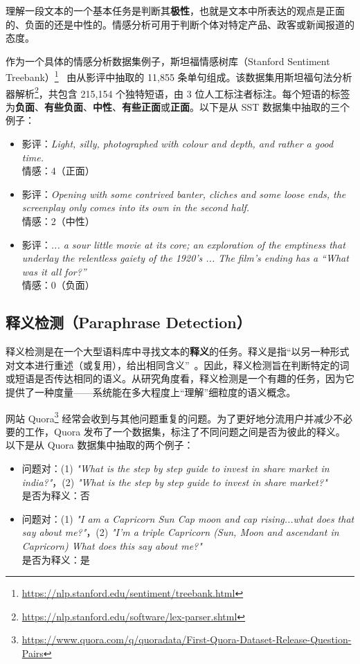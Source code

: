 \documentclass[11pt]{article}
\begin{document}
理解一段文本的一个基本任务是判断其\textbf{极性}，也就是文本中所表达的观点是正面的、负面的还是中性的。情感分析可用于判断个体对特定产品、政客或新闻报道的态度。

作为一个具体的情感分析数据集例子，斯坦福情感树库（Stanford Sentiment Treebank）\footnote{\url{https://nlp.stanford.edu/sentiment/treebank.html}}~\cite{socher2013recursive} 由从影评中抽取的 11{,}855 条单句组成。该数据集用斯坦福句法分析器解析\footnote{\url{https://nlp.stanford.edu/software/lex-parser.shtml}}，共包含 215{,}154 个独特短语，由 3 位人工标注者标注。每个短语的标签为\textbf{负面}、\textbf{有些负面}、\textbf{中性}、\textbf{有些正面}或\textbf{正面}。以下是从 SST 数据集中抽取的三个例子：

\begin{itemize}[leftmargin=2em]
  \item 影评：\textit{Light, silly, photographed with colour and depth, and rather a good time.}\\
        情感：4（正面）
  \item 影评：\textit{Opening with some contrived banter, cliches and some loose ends, the screenplay only comes into its own in the second half.}\\
        情感：2（中性）
  \item 影评：\textit{... a sour little movie at its core; an exploration of the emptiness that underlay the relentless gaiety of the 1920's ... The film's ending has a ``What was it all for?''}\\
        情感：0（负面）
\end{itemize}

\subsection{释义检测（Paraphrase Detection）}

释义检测是在一个大型语料库中寻找文本的\textbf{释义}的任务。释义是指``以另一种形式对文本进行重述（或复用），给出相同含义''~\cite{fernando2008semantic}。因此，释义检测旨在判断特定的词或短语是否传达相同的语义。从研究角度看，释义检测是一个有趣的任务，因为它提供了一种度量——系统能在多大程度上``理解''细粒度的语义概念。

网站 Quora\footnote{\url{https://www.quora.com/q/quoradata/First-Quora-Dataset-Release-Question-Pairs}} 经常会收到与其他问题重复的问题。为了更好地分流用户并减少不必要的工作，Quora 发布了一个数据集，标注了不同问题之间是否为彼此的释义。以下是从 Quora 数据集中抽取的两个例子：

\begin{itemize}[leftmargin=2em]
  \item 问题对：(1) \textit{"What is the step by step guide to invest in share market in india?"}，(2) \textit{"What is the step by step guide to invest in share market?"}\\
        是否为释义：否
  \item 问题对：(1) \textit{"I am a Capricorn Sun Cap moon and cap rising...what does that say about me?"}，(2) \textit{"I'm a triple Capricorn (Sun, Moon and ascendant in Capricorn) What does this say about me?"}\\
        是否为释义：是
\end{itemize}
\end{document}
